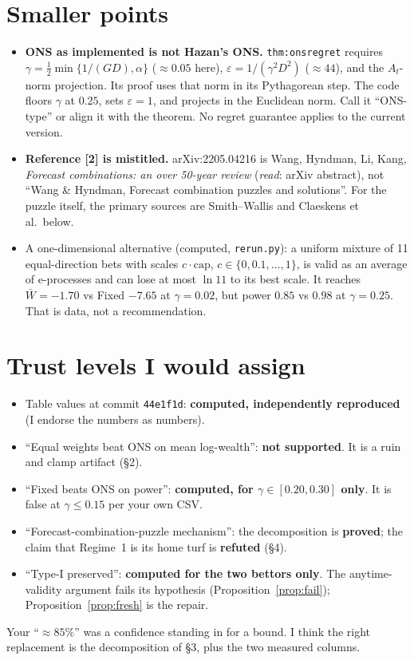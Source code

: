 \documentclass[11pt]{article}
\begin{document}
\section{Smaller points}
\begin{itemize}[nosep]
\item \textbf{ONS as implemented is not Hazan's ONS.} \texttt{thm:onsregret} requires $\gamma=\tfrac12\min\{1/(GD),\alpha\}$ ($\approx0.05$ here), $\varepsilon=1/(\gamma^2D^2)$ ($\approx44$), and the $A_t$-norm projection. Its proof uses that norm in its Pythagorean step. The code floors $\gamma$ at $0.25$, sets $\varepsilon=1$, and projects in the Euclidean norm. Call it ``ONS-type'' or align it with the theorem. No regret guarantee applies to the current version.
\item \textbf{Reference [2] is mistitled.} arXiv:2205.04216 is Wang, Hyndman, Li, Kang, \emph{Forecast combinations: an over 50-year review} (\emph{read}: arXiv abstract), not ``Wang \& Hyndman, Forecast combination puzzles and solutions''. For the puzzle itself, the primary sources are Smith--Wallis and Claeskens et al.\ below.
\item A one-dimensional alternative (computed, \texttt{rerun.py}): a uniform mixture of 11 equal-direction bets with scales $c\cdot\mathrm{cap}$, $c\in\{0,0.1,\dots,1\}$, is valid as an average of e-processes and can lose at most $\ln 11$ to its best scale. It reaches $\bar W=-1.70$ vs Fixed $-7.65$ at $\gamma=0.02$, but power $0.85$ vs $0.98$ at $\gamma=0.25$. That is data, not a recommendation.
\end{itemize}

\section{Trust levels I would assign}
\begin{itemize}[nosep]
\item Table values at commit \texttt{44e1f1d}: \textbf{computed, independently reproduced} (I endorse the numbers as numbers).
\item ``Equal weights beat ONS on mean log-wealth'': \textbf{not supported}. It is a ruin and clamp artifact (\S2).
\item ``Fixed beats ONS on power'': \textbf{computed, for $\gamma\in[0.20,0.30]$ only}. It is false at $\gamma\le0.15$ per your own CSV.
\item ``Forecast-combination-puzzle mechanism'': the decomposition is \textbf{proved}; the claim that Regime~1 is its home turf is \textbf{refuted} (\S4).
\item ``Type-I preserved'': \textbf{computed for the two bettors only}. The anytime-validity argument fails its hypothesis (Proposition~\ref{prop:fail}); Proposition~\ref{prop:fresh} is the repair.
\end{itemize}
Your ``$\approx85\%$'' was a confidence standing in for a bound. I think the right replacement is the decomposition of \S3, plus the two measured columns.
\end{document}
